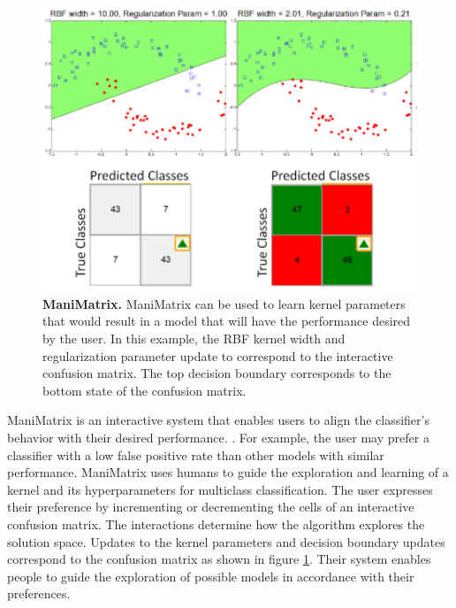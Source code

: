 \begin{figure}[h]
\centering
\includegraphics[width=1\textwidth]{manimatrix}
\caption{ \textbf{ManiMatrix.} ManiMatrix can be used to learn kernel parameters that would result in a model that will have the performance desired by the user. In this example, the RBF kernel width and regularization parameter update to correspond to the interactive confusion matrix. The top decision boundary corresponds to the bottom state of the confusion matrix. }\label{fig:manimatrix}
\end{figure}

ManiMatrix is an interactive system that enables users to align the classifier's behavior with their desired performance. \cite{ManiMatrix}. For example, the user may prefer a classifier with a low false positive rate than other models with similar performance. ManiMatrix uses humans to guide the exploration and learning of a kernel and its hyperparameters for multiclass classification. The user expresses their preference by incrementing or decrementing the cells of an interactive confusion matrix. The interactions determine how the algorithm explores the solution space. Updates to the kernel parameters and decision boundary updates correspond to the confusion matrix as shown in figure \ref{fig:manimatrix}. Their system enables people to guide the exploration of possible models in accordance with their preferences. 

